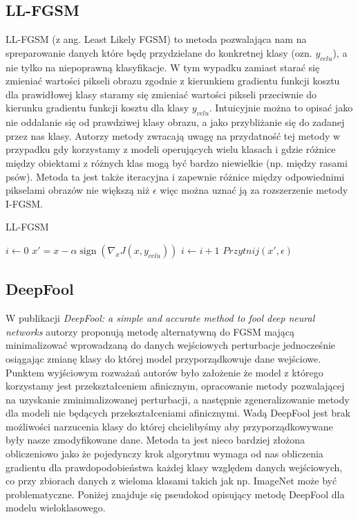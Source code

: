 \documentclass{article}
\begin{document}
    \subsection{LL-FGSM}
    LL-FGSM (z ang. Least Likely FGSM) to metoda pozwalająca nam na spreparowanie danych które będę przydzielane do
    konkretnej klasy (ozn. $y_{celu}$), a nie tylko na niepoprawną klasyfikacje. W tym wypadku zamiast starać się
    zmieniać wartości pikseli obrazu zgodnie z kierunkiem gradientu funkcji kosztu dla prawidłowej klasy
    staramy się zmieniać wartości pikseli przeciwnie do kierunku gradientu funkcji kosztu dla klasy $y_{celu}$.
    Intuicyjnie można to opisać jako nie oddalanie się od prawdziwej klasy obrazu, a jako przybliżanie się do zadanej
    przez nas klasy.
    Autorzy metody zwracają uwagę na przydatność tej metody
    w przypadku gdy korzystamy z modeli operujących wielu klasach i gdzie różnice między obiektami z różnych klas mogą
    być bardzo niewielkie (np. między rasami psów). Metoda ta jest także iteracyjna i zapewnie różnice między
    odpowiednimi pikselami obrazów nie większą niż $\epsilon$ więc można uznać ją za rozszerzenie metody I-FGSM.

    \begin{algorithm}
    \caption{LL-FGSM}\label{LLFGSM}
    \begin{algorithmic}[1]
    \State $i \gets 0$
        \State $x' = x - \alpha\operatorname{sign}(\nabla_{x} J(x, y_{celu}))$
        \State $i \gets i+1$
        \State $Przytnij(x', \epsilon)$
    \EndWhile
    \end{algorithmic}
    \end{algorithm}

\subsection{DeepFool}
W publikacji \textit{DeepFool: a simple and accurate method to fool deep neural networks}\cite{DBLP:journals/corr/Moosavi-Dezfooli15}
autorzy proponują metodę alternatywną do FGSM mającą minimalizować wprowadzaną do danych wejściowych perturbacje jednocześnie
osiągając zmianę klasy do której model przyporządkowuje dane wejściowe. Punktem wyjściowym rozważań autorów było założenie
że model z którego korzystamy jest przekształceniem afinicznym, opracowanie metody pozwalającej na
uzyskanie zminimalizowanej perturbacji, a następnie zgeneralizowanie metody dla modeli nie będących przekształceniami afinicznymi.
Wadą DeepFool jest brak możliwości narzucenia klasy do której chcielibyśmy aby przyporządkowywane były nasze zmodyfikowane dane.
Metoda ta jest nieco bardziej złożona obliczeniowo jako że pojedynczy krok algorytmu wymaga od nas obliczenia gradientu dla
prawdopodobieństwa każdej klasy względem danych wejściowych, co przy zbiorach danych z wieloma klasami
takich jak np. ImageNet może być problematyczne. Poniżej znajduje się pseudokod opisujący metodę DeepFool dla modelu
wieloklasowego.
\end{document}
